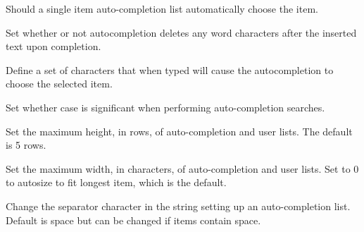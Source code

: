 \label{wxstyledtextctrlautocompsetchoosesingle}


Should a single item auto-completion list automatically choose the item.


\label{wxstyledtextctrlautocompsetdroprestofword}


Set whether or not autocompletion deletes any word characters
after the inserted text upon completion.


\label{wxstyledtextctrlautocompsetfillups}


Define a set of characters that when typed will cause the autocompletion to
choose the selected item.


\label{wxstyledtextctrlautocompsetignorecase}


Set whether case is significant when performing auto-completion searches.


\label{wxstyledtextctrlautocompsetmaxheight}


Set the maximum height, in rows, of auto-completion and user lists.
The default is 5 rows.


\label{wxstyledtextctrlautocompsetmaxwidth}


Set the maximum width, in characters, of auto-completion and user lists.
Set to 0 to autosize to fit longest item, which is the default.


\label{wxstyledtextctrlautocompsetseparator}


Change the separator character in the string setting up an auto-completion list.
Default is space but can be changed if items contain space.


